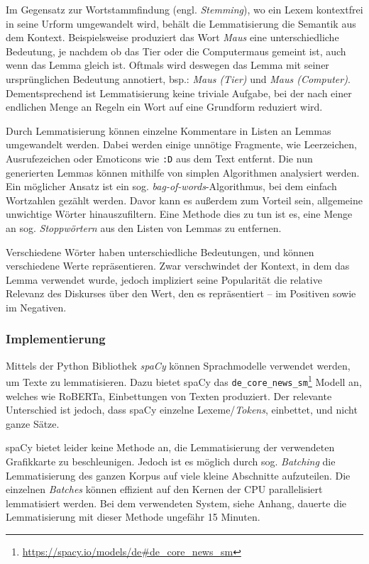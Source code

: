 Im Gegensatz zur Wortstammfindung (engl. \emph{Stemming}), wo ein Lexem kontextfrei in seine Urform umgewandelt wird, behält die Lemmatisierung die Semantik aus dem Kontext.
Beispielsweise produziert das Wort \emph{Maus} eine unterschiedliche Bedeutung, je nachdem ob das Tier oder die Computermaus gemeint ist, auch wenn das Lemma gleich ist.
Oftmals wird deswegen das Lemma mit seiner ursprünglichen Bedeutung annotiert, bsp.: \emph{Maus (Tier)} und \emph{Maus (Computer)}.
Dementsprechend ist Lemmatisierung keine triviale Aufgabe, bei der nach einer endlichen Menge an Regeln ein Wort auf eine Grundform reduziert wird.

Durch Lemmatisierung können einzelne Kommentare in Listen an Lemmas umgewandelt werden.
Dabei werden einige unnötige Fragmente, wie Leerzeichen, Ausrufezeichen oder Emoticons wie \lstinline|:D| aus dem Text entfernt.
Die nun generierten Lemmas können mithilfe von simplen Algorithmen analysiert werden.
Ein möglicher Ansatz ist ein sog. \emph{bag-of-words}-Algorithmus, bei dem einfach Wortzahlen gezählt werden.
Davor kann es außerdem zum Vorteil sein, allgemeine unwichtige Wörter hinauszufiltern.
Eine Methode dies zu tun ist es, eine Menge an sog. \emph{Stoppwörtern} aus den Listen von Lemmas zu entfernen.

Verschiedene Wörter haben unterschiedliche Bedeutungen, und können verschiedene Werte repräsentieren.
Zwar verschwindet der Kontext, in dem das Lemma verwendet wurde, jedoch impliziert seine Popularität die relative Relevanz des Diskurses über den Wert, den es repräsentiert -- im Positiven sowie im Negativen.

\subsubsection{Implementierung}
Mittels der Python Bibliothek \emph{spaCy} \autocite{HMVB20} können Sprachmodelle verwendet werden, um Texte zu lemmatisieren.
Dazu bietet spaCy das \lstinline|de_core_news_sm|\footnote{\url{https://spacy.io/models/de\#de_core_news_sm}} Modell an, welches wie RoBERTa, Einbettungen von Texten produziert.
Der relevante Unterschied ist jedoch, dass spaCy einzelne Lexeme/\emph{Tokens}, einbettet, und nicht ganze Sätze.

spaCy bietet leider keine Methode an, die Lemmatisierung der verwendeten Grafikkarte zu beschleunigen.
Jedoch ist es möglich durch sog. \emph{Batching} die Lemmatisierung des ganzen Korpus auf viele kleine Abschnitte aufzuteilen.
Die einzelnen \emph{Batches} können effizient auf den Kernen der CPU parallelisiert lemmatisiert werden.
Bei dem verwendeten System, siehe Anhang, dauerte die Lemmatisierung mit dieser Methode ungefähr 15 Minuten.

